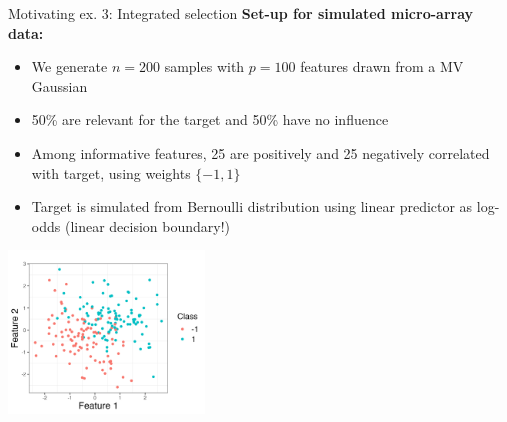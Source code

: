 \documentclass[11pt,compress,t,notes=noshow, xcolor=table]{beamer}
\begin{document}
\begin{vbframe}{Motivating ex. 3: Integrated selection}
\vspace{-0.15cm}
\textbf{Set-up for simulated micro-array data:}
\vspace{-0.1cm}
  \begin{itemize}\small
  \setlength{\itemsep}{0.7em}
  \item We generate $n=200$ samples with $p=100$ features drawn from a MV Gaussian
  \item 50\% are relevant for the target and 50\% have no influence
  \item Among informative features, 25 are positively and 25 negatively correlated with target,  using weights $\{-1,1\}$
  \item Target is simulated from Bernoulli distribution using linear predictor as log-odds (linear decision boundary!)
  \end{itemize}
  \vspace{-0.35cm}


  \begin{center} \includegraphics[width=0.39\textwidth]{figure/fs-micro-array.png}
  \end{center}

  \framebreak


\end{vbframe}
\end{document}
